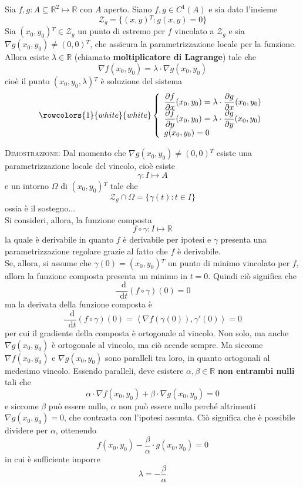 \documentclass[a4paper]{extarticle}
\newcommand*\dif{\mathop{}\!\mathrm{d}}
\begin{document}
\vspace{1em}
\noindent
Sia $f,g : A \subseteq \mathbb{R}^2 \longmapsto \mathbb{R}$ con $A$ aperto. Siano $f,g \in C^1(A)$ e sia dato l'insieme
\[\mathcal{Z}_g = \{(x,y){^T} : g(x,y) = 0\}\]
Sia $(x_0,y_0){^T} \in \mathcal{Z}_g$ un punto di estremo per $f$ vincolato a $\mathcal{Z}_g$ e sia $\nabla g(x_0,y_0) \neq (0,0){^T}$, che assicura la parametrizzazione locale per la funzione.\\
Allora esiste $\lambda \in \mathbb{R}$ (chiamato \textbf{moltiplicatore di Lagrange}) tale che
\[\nabla f(x_0,y_0) = \lambda \cdot \nabla g(x_0,y_0)\]
cioè il punto $(x_0,y_0, \lambda){^T}$ è soluzione del sistema
\[
    \rowcolors{1}{white}{white}
    \left\{
    \begin{array}{l}
        \dfrac{\partial f}{\partial x} (x_0,y_0) = \lambda \cdot \dfrac{\partial g}{\partial x}(x_0,y_0)\\
        \dfrac{\partial f}{\partial y} (x_0,y_0) = \lambda \cdot \dfrac{\partial g}{\partial y}(x_0,y_0)\\
        g(x_0,y_0) = 0
    \end{array}
    \right.
\]

\vspace{2em}
\noindent
\normalfont \normalsize
\textsc{Dimostrazione}: Dal momento che $\nabla g(x_0,y_0) \neq (0,0){^T}$ esiste una parametrizzazione locale del vincolo, cioè esiste
\[\gamma : I \longmapsto A\]
e un intorno $\Omega$ di $(x_0,y_0){^T}$ tale che
\[\mathcal{Z}_g \cap \Omega = \{\gamma(t) : t \in I\}\]
ossia è il sostegno...\\
Si consideri, allora, la funzione composta
\[f \circ \gamma : I \longmapsto \mathbb{R}\]
la quale è derivabile in quanto $f$ è derivabile per ipotesi e $\gamma$ presenta una parametrizzazione regolare grazie al fatto che $f$ è derivabile.\\
Se, allora, si assume che $\gamma(0)=(x_0,y_0){^T}$ un punto di minimo vincolato per $f$, allora la funzione composta presenta un minimo in $t=0$. Quindi ciò significa che
\[\dfrac{\dif}{\dif t} (f \circ \gamma) (0) = 0\]
ma la derivata della funzione composta è
\[\dfrac{\dif}{\dif t} (f \circ \gamma) (0) = \left<\nabla f(\gamma(0)), \gamma'(0)\right> = 0\]
per cui il gradiente della composta è ortogonale al vincolo. Non solo, ma anche $\nabla g(x_0,y_0)$ è ortogonale al vincolo, ma ciò accade sempre. Ma siccome $\nabla f(x_0,y_0)$ e $\nabla g(x_0,y_0)$ sono paralleli tra loro, in quanto ortogonali al medesimo vincolo. Essendo paralleli, deve esistere $\alpha, \beta \in \mathbb{R}$ \textbf{non entrambi nulli} tali che
\[\alpha \cdot \nabla f(x_0,y_0) + \beta \cdot \nabla g(x_0,y_0) = 0\]
e siccome $\beta$ può essere nullo, $\alpha$ non può essere nullo perché altrimenti $\nabla g(x_0,y_0) =0$, che contrasta con l'ipotesi assunta. Ciò significa che è possibile dividere per $\alpha$, ottenendo
\[f(x_0,y_0) - \dfrac{\beta}{\alpha} \cdot g(x_0,y_0) = 0\]
in cui è sufficiente imporre
\[\lambda = - \dfrac{\beta}{\alpha}\]
\end{document}
